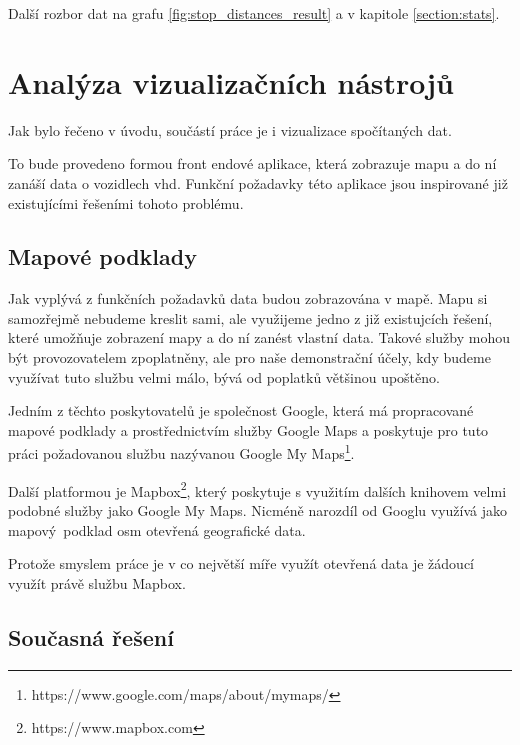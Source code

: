 \bigbreak

Další rozbor dat na grafu \ref{fig:stop_distances_result} a v kapitole \ref{section:stats}.




\section{Analýza vizualizačních nástrojů}

Jak bylo řečeno v úvodu, součástí práce je i vizualizace spočítaných dat.

\bigbreak

To bude provedeno formou front endové aplikace, která zobrazuje mapu a do ní zanáší data o vozidlech \gls{vhd}. Funkční požadavky této aplikace jsou inspirované již existujícími řešeními tohoto problému.

\subsection{Mapové podklady}

Jak vyplývá z funkčních požadavků data budou zobrazována v mapě. Mapu si samozřejmě nebudeme kreslit sami, ale využijeme jedno z již existujcích řešení, které umožňuje zobrazení mapy a do ní zanést vlastní data. Takové služby mohou být provozovatelem zpoplatněny, ale pro naše demonstrační účely, kdy budeme využívat tuto službu velmi málo, bývá od poplatků většinou upoštěno.

\bigbreak

Jedním z těchto poskytovatelů je společnost Google, která má propracované mapové podklady a prostřednictvím služby Google Maps a poskytuje pro tuto práci požadovanou službu nazývanou Google My Maps\footnote{https://www.google.com/maps/about/mymaps/}.

\bigbreak

Další platformou je Mapbox\footnote{https://www.mapbox.com}, který poskytuje s využitím dalších knihovem velmi podobné služby jako Google My Maps. Nicméně narozdíl od Googlu využívá jako mapový podklad \gls{osm} {otevřená geografické data}.

\bigbreak

Protože smyslem práce je v co největší míře využít otevřená data je žádoucí využít právě službu Mapbox.

\subsection{Současná řešení} \label{subsection:soucasna_reseni_front_end}

